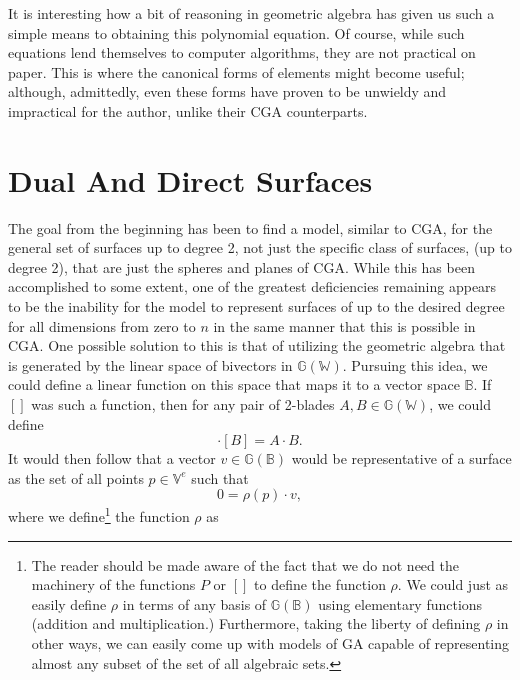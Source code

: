 \documentclass{birkjour}
\theoremstyle{definition}
\theoremstyle{remark}
\numberwithin{equation}{section}
\newcommand{\G}{\mathbb{G}}
\newcommand{\V}{\mathbb{V}}
\newcommand{\W}{\mathbb{W}}
\newcommand{\B}{\mathbb{B}}
\begin{document}
It is interesting how a bit of reasoning in geometric algebra has given us such a simple means
to obtaining this polynomial equation.
Of course, while such equations lend themselves to computer algorithms, they
are not practical on paper.  This is where the canonical forms of elements might become
useful; although, admittedly, even these forms have proven to be unwieldy
and impractical for the author, unlike their CGA counterparts.

\section{Dual And Direct Surfaces}\label{sec_deal_dir_surf}

The goal from the beginning has been to find a model, similar
to CGA, for the general set of surfaces up to degree 2,
not just the specific class of surfaces, (up to degree 2), that are just the spheres and planes of CGA.
While this has been accomplished to some extent, one of the greatest deficiencies
remaining appears to be the inability for the model to represent surfaces of up to
the desired degree for
all dimensions from zero to $n$ in the same manner that this is possible in CGA.
One possible solution to this is that of utilizing the geometric
algebra that is generated by the linear space of bivectors in $\G(\W)$.  Pursuing
this idea, we could
define a linear function on this space that maps it to a vector space $\B$.  If $[]$ was such
a function, then for any pair of 2-blades $A,B\in\G(\W)$, we could define
\begin{equation}
[A]\cdot [B]=A\cdot B.
\end{equation}
It would then follow that a vector $v\in\G(\B)$ would be
representative of a surface as the set of all points $p\in\V^e$ such that
\begin{equation}\label{equ_dual_surf_set}
0 = \rho(p)\cdot v,
\end{equation}
where we define\footnote{The reader should be made aware of the fact
that we do not need the machinery of the functions $P$ or $[]$ to
define the function $\rho$.  We could just as easily define $\rho$
in terms of any basis of $\G(\B)$ using elementary functions (addition and multiplication.)  Furthermore, taking the liberty of defining
$\rho$ in other ways, we can easily come up with models of GA capable of representing
almost any subset of the set of all algebraic sets.} the function $\rho$ as
\end{document}
